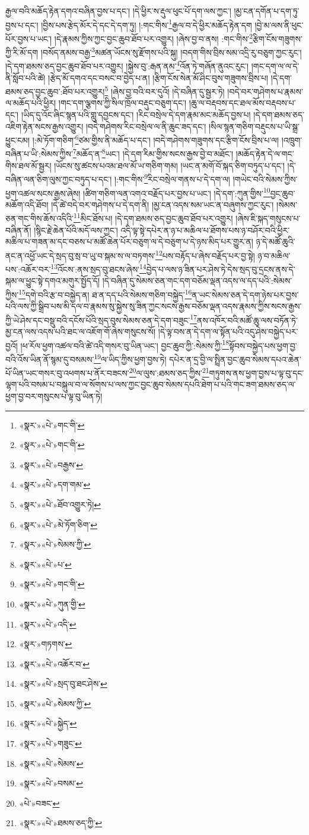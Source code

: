 རྒྱལ་བའི་མཆོད་རྟེན་དགའ་བཞིན་བྱས་པ་དང་། །དེ་ཕྱིར་ས་རྡུལ་ཕུང་པོ་དག་ལས་ཀྱང་། །མྱ་ངན་དགོན་པ་དག་ཏུ་བྱས་པ་དང་། །བྱིས་པས་རྩེད་མོར་དེ་དང་དེ་དག་ཏུ། །:གང་གིས་\footnote{«སྣར་»«པེ་»གང་གི་}རྒྱལ་བ་དེ་ཕྱིར་མཆོད་རྟེན་དག །བྱེ་མ་ལས་ནི་ཕུང་པོར་བྱས་པ་ཡང་། །དེ་རྣམས་ཀྱིས་ཀྱང་བྱང་ཆུབ་ཐོབ་པར་འགྱུར། །ཞེས་བྱ་བ་ནས། :གང་གིས་\footnote{«སྣར་»«པེ་»གང་གི་}རྩིག་ངོས་གཟུགས་ཀྱི་རི་མོ་དག །བསོད་ནམས་བརྒྱ་\footnote{«སྣར་»«པེ་»བརྒྱས་}མཚན་ཡོངས་སུ་རྫོགས་པའི་སྐུ། །བདག་གིས་བྲིས་སམ་འདྲི་རུ་བཅུག་ཀྱང་རུང་། །དེ་དག་ཐམས་ཅད་བྱང་ཆུབ་ཐོབ་པར་འགྱུར། །སྐྱེས་བུ་:རྒན་ནམ་\footnote{«སྣར་»«པེ་»དག་གམ་}འོན་ཏེ་གཞོན་ནུའང་རུང་། །གང་དག་ལ་ལ་དེ་ནི་སློབ་པའི་ཚེ། །རྩེད་མོ་དགའ་དང་བསང་བ་བྱེད་པ་ན། །རྩིག་ངོས་སེན་མོ་ཤིང་བུས་གཟུགས་བྲིས་པ། །དེ་དག་ཐམས་ཅད་བྱང་ཆུབ་:ཐོབ་པར་འགྱུར།\footnote{«སྣར་»«པེ་»ཐོབ་འགྱུར་ཏེ།} །ཞེས་བྱ་བའི་བར་དུའོ། །དེ་བཞིན་དུ་སྦྱར་ཏེ། །བདེ་བར་གཤེགས་པ་རྣམས་ལ་མཆོད་པའི་ཕྱིར། །གང་དག་ལྕགས་ཀྱི་སིལ་ཁྲོལ་བརྡུང་བཅུག་དང་། །ཆུ་ལ་བརྡབས་དང་ཐལ་མོས་བརྡབས་པ་དང་། །ཡིད་དུ་འོང་ཞིང་སྙན་པའི་གླུ་དབྱངས་དང་། །རིང་བསྲེལ་དེ་དག་རྣམ་མང་མཆོད་བྱས་པ། །དེ་དག་ཐམས་ཅད་འཇིག་རྟེན་སངས་རྒྱས་འགྱུར། །བདེ་གཤེགས་རིང་བསྲེལ་ལ་ནི་ཆུང་ཟད་དང་། །སིལ་སྙན་གཅིག་བརྡུངས་པ་ཡི་སྒྲ་ཕྱུང་ངམ། །:མེ་ཏོག་གཅིག་\footnote{«སྣར་»«པེ་»མེ་ཏོག་ཅིག་}ཙམ་གྱིས་ནི་མཆོད་པ་དང་། །བདེ་གཤེགས་གཟུགས་དང་རྩིག་ངོས་བྲིས་པ་ལ། །འཁྲུག་བཞིན་པ་ཡི་:སེམས་ཀྱིས་\footnote{«སྣར་»«པེ་»སེམས་ཀྱི་}མཆོད་ན་\footnote{«སྣར་»«པེ་»པ་}ཡང་། །དེ་དག་རིམ་གྱིས་སངས་རྒྱས་བྱེ་བ་མཐོང་། །མཆོད་རྟེན་དེ་ལ་གང་གིས་ཐལ་མོ་སྦྱར། །ཡོངས་སུ་ཚངས་པའམ་ཐལ་མོ་ཡ་གཅིག་གམ། །ཡང་ན་མགོ་བོ་སྐད་ཅིག་བཏུད་པ་དང་། །དེ་བཞིན་ལན་ཅིག་ལུས་ཀྱང་བཏུད་པ་དང་། །:གང་གིས་\footnote{«སྣར་»«པེ་»གང་གི་}རིང་བསྲེལ་གནས་པ་དེ་དག་ལ། །གཡེང་བའི་སེམས་ཀྱིས་ཕྱག་འཚལ་སངས་རྒྱས་ཞེས། །ཚིག་གཅིག་ལན་འགའ་བརྗོད་པར་བྱས་པ་ཡང་། །དེ་དག་:ཀུན་གྱིས་\footnote{«སྣར་»«པེ་»ཀུན་གྱི་}བྱང་ཆུབ་མཆོག་འདི་ཐོབ། །དེ་ཚེ་བདེ་བར་གཤེགས་པ་དེ་དག་ནི། །མྱ་ངན་འདས་སམ་ཡང་ན་བཞུགས་ཀྱང་རུང་། །སེམས་ཅན་གང་གིས་ཆོས་འདིའི་\footnote{«སྣར་»«པེ་»འདི་}མིང་ཐོས་པ། །དེ་དག་ཐམས་ཅད་བྱང་ཆུབ་ཐོབ་པར་འགྱུར། །ཞེས་ཇི་སྐད་གསུངས་པ་བཞིན་ནོ། །སྙིང་རྗེ་ཆེན་པོའི་མདོ་ལས་ཀྱང་། འདི་ལྟ་སྟེ་དཔེར་ན་ཉ་པ་མཆིལ་པ་ཐོགས་པས་ཉ་བཤོར་བའི་ཕྱིར་མཆིལ་པ་གཟན་མ་དང་བཅས་པ་མཚོ་ཆེན་པོར་བཅུག་ལ་དེ་བཅུག་པ་དེ་ཉས་མིད་པར་གྱུར་ན། ཉ་དེ་མཚོ་ཆུའི་ནང་ན་འཕྱོ་ཡང་དེ་སྲད་བུ་སྲ་བ་ཡུ་བ་སྐམ་ས་ལ་བཏགས་\footnote{«སྣར་»གཏགས་}པས་བརྟོད་པ་ཞེས་བརྗོད་པར་བྱ་སྟེ། ཉ་བ་མཆིལ་པས་:འཆོར་བར་\footnote{«སྣར་»«པེ་»འཆོར་བ་}འོངས་:ནས་སྲད་བུ་ཐངས་ཞེས་\footnote{«སྣར་»«པེ་»སྲད་བུ་ཐང་ཤེས་}བྱེད་པ་ལས་ཉ་ཟིན་པར་ཤེས་ཏེ་དེས་སྲད་བུ་དྲངས་ནས་དེ་སྐམ་ལ་ཕྱུང་སྟེ་དགའ་མགུར་སྤྱོད་དོ། །དེ་བཞིན་དུ་སེམས་ཅན་གང་དག་བཅོམ་ལྡན་འདས་ལ་དད་པའི་:སེམས་ཀྱིས་\footnote{«སྣར་»«པེ་»སེམས་ཀྱི་}དགེ་བའི་རྩ་བ་བསྐྱེད་ན། ཐ་ན་དད་པའི་སེམས་གཅིག་བསྐྱེད་\footnote{«སྣར་»«པེ་»སྐྱེད་}ན་ཡང་སེམས་ཅན་དེ་དག་ཉེས་པར་བྱས་པའི་ལས་ཀྱི་སྒྲིབ་པས་མི་དལ་བ་རྣམས་སུ་སྐྱེས་སུ་ཟིན་ཀྱང་སངས་རྒྱས་བཅོམ་ལྡན་འདས་རྣམས་ཀྱིས་སངས་རྒྱས་ཀྱི་ཡེ་ཤེས་དང་བསྡུ་བའི་དངོས་པོའི་སྲད་བུས་སེམས་ཅན་དེ་དག་བཟུང་\footnote{«སྣར་»«པེ་»གཟུང་}ནས་འཁོར་བའི་མཚོ་ཆུ་ལས་བཏོན་ཏེ་མྱ་ངན་ལས་འདས་པའི་ཐང་ལ་འཇོག་གོ་ཞེས་གསུངས་སོ། །དེ་ལྟ་བས་ན་དེ་དག་ལ་སྟོན་པའི་འདུ་ཤེས་བསྐྱེད་པར་བྱའོ། །ཕ་རོལ་ཕྱག་འཚལ་བའི་ཚེ་འདི་གསར་བུ་ཡིན་ཡང་། བྱང་ཆུབ་ཀྱི་:སེམས་ཀྱི་\footnote{«སྣར་»«པེ་»སེམས་}སྟོབས་བསྐྱེད་པས་ཕྱག་བྱ་བའི་འོས་ཡིན་ནོ་སྙམ་དུ་བསམས་\footnote{«སྣར་»«པེ་»བསམ་}ལ་ཡིད་ཀྱིས་ཕྱག་བྱས་ཏེ། དཔེར་ན་དྲ་བྱི་ལ་སྤྲིན་བྱང་ཆུབ་སེམས་དཔའ་ཆེན་པོ་ཡིན་ཡང་གསར་བུ་འཕགས་པ་ནོར་བཟངས་\footnote{«པེ་»བཟང་}ལ་ལུས་:ཐམས་ཅད་ཀྱིས་\footnote{«སྣར་»«པེ་»ཐམས་ཅད་ཀྱི་}གཏུགས་ནས་ཕྱག་བྱས་པ་ལྟ་བུ་དང་ལྷག་པའི་བསམ་པ་བསྐུལ་བ་ལ་སོགས་པ་ལས་ཀྱང་བྱང་ཆུབ་སེམས་དཔའི་ཐེག་པ་པའི་གང་ཟག་ཐམས་ཅད་ལ་ཕྱག་བྱ་བར་གསུངས་པ་ལྟ་བུ་ཡིན་ཏེ། 